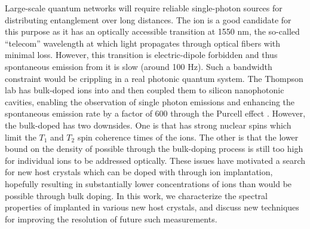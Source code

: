 Large-scale quantum networks will require reliable single-photon sources for distributing entanglement over long distances. The \erbium ion is a good candidate for this purpose as it has an optically accessible transition at 1550 nm, the so-called ``telecom'' wavelength at which light propagates through optical fibers with minimal loss. However, this transition is electric-dipole forbidden and thus spontaneous emission from it is slow (around 100 Hz).
Such a bandwidth constraint would be crippling in a real photonic quantum system. The Thompson lab has bulk-doped \erbium ions into \YSO and then coupled them to silicon nanophotonic cavities, enabling the observation of single photon emissions and enhancing the spontaneous emission rate by a factor of 600 through the Purcell effect \cite{Dibos2017}.
However, the bulk-doped \ErYSO has two downsides. One is that \YSO has strong nuclear spins which limit the  $T_{1}$ and $T_{2}$ spin coherence times of the \erbium ions. The other is that the lower bound on the density of \erbium possible through the bulk-doping process is still too high for individual \erbium ions to be addressed optically.
These issues have motivated a search for new host crystals which can be doped with \erbium through ion implantation, hopefully resulting in substantially lower concentrations of \erbium ions than would be possible through bulk doping. In this work, we characterize the spectral properties of \erbium implanted in various new host crystals, and discuss new techniques for improving the resolution of future such measurements.